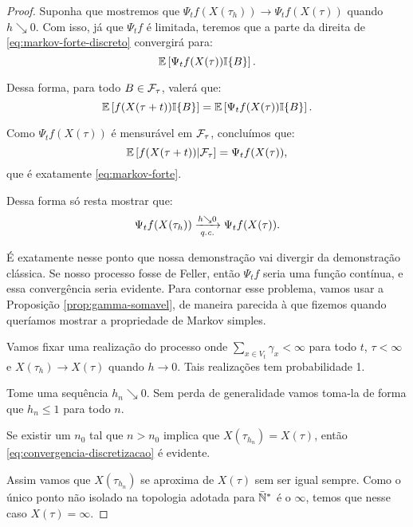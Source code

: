 \begin{proof}
  Suponha que mostremos que $\Psi_t f (X(\tau_h)) \to \Psi_t
  f(X(\tau))$ \qc quando $h \searrow 0$. Com isso, já que $\Psi_t f$ é
  limitada, teremos que a parte da direita de
  \eqref{eq:markov-forte-discreto} convergirá para:
  \begin{displaymath}
    {\mathbb{E}} \left[ \Psi_t f (X(\tau)) {\mathbb{I}}\{B\} \right].
  \end{displaymath}

  Dessa forma, para todo $B \in {\mathcal{F}}_{\tau}$, valerá que:
  \begin{displaymath}
    {\mathbb{E}} \left[ f(X(\tau + t)) {\mathbb{I}}\{B\} \right]
    = {\mathbb{E}} \left[ \Psi_t f (X(\tau)) {\mathbb{I}}\{B\} \right].
  \end{displaymath}

  Como $\Psi_t f(X(\tau))$ é mensurável em ${\mathcal{F}}_\tau$, concluímos que:
  \begin{displaymath}
    {\mathbb{E}} \left[ f(X(\tau + t)) \middle| {\mathcal{F}}_\tau \right]
    = \Psi_t f (X(\tau)),
  \end{displaymath}
  que é exatamente \eqref{eq:markov-forte}.

  Dessa forma só resta mostrar que:
  \begin{equation}
    \label{eq:convergencia-discretizacao}
    \Psi_t f (X(\tau_h)) \xrightarrow[{\emph{q.c.}}]{h \searrow 0}  \Psi_t f(X(\tau)).
  \end{equation}

  É exatamente nesse ponto que nossa demonstração vai divergir da
  demonstração clássica. Se nosso processo fosse de Feller, então
  $\Psi_t f$ seria uma função contínua, e essa convergência seria
  evidente. Para contornar esse problema, vamos usar a Proposição
  \ref{prop:gamma-somavel}, de maneira parecida à que fizemos quando
  queríamos mostrar a propriedade de Markov simples.

  Vamos fixar uma realização do processo onde $\sum_{x \in V_t}
  \gamma_x < \infty$ para todo $t$, $\tau < \infty$ e $X(\tau_{h}) \to
  X(\tau)$ quando $h \to 0$. Tais realizações tem probabilidade 1.

  Tome uma sequência $h_n \searrow 0$. Sem perda de generalidade vamos
  toma-la de forma que $h_n \leq 1$ para todo $n$.

  Se existir um $n_0$ tal que $n > n_0$ implica que $X(\tau_{h_n}) =
  X(\tau)$, então \eqref{eq:convergencia-discretizacao} é evidente.

  Assim vamos que $X(\tau_{h_n})$ se aproxima de $X(\tau)$ sem ser
  igual sempre. Como o único ponto não isolado na topologia
  adotada para ${\mathbb{\bar{N}^*}}$ é o $\infty$, temos que nesse caso $X(\tau) =
  \infty$.


\end{proof}
